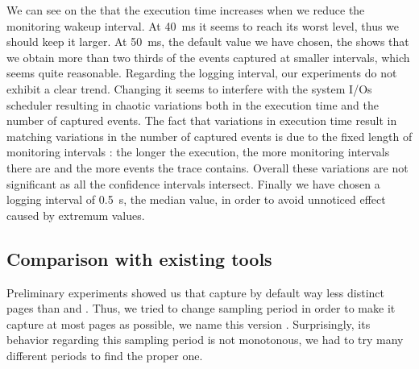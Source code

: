 We can see on the  that the execution time increases when we
reduce the monitoring wakeup interval. At \SI{40}{ms}
it seems to reach its worst level, thus we should keep it larger. At \SI{50}{ms}, the default value we have chosen, the
 shows that we obtain more than two thirds of the events captured
at smaller intervals, which seems quite reasonable.
Regarding the logging interval, our experiments do not exhibit a clear trend. Changing it seems to interfere with the system I/Os scheduler resulting in chaotic
variations both in the execution time and the number of captured events. The fact that variations in execution time result in matching variations in the number
of captured events is due to the fixed length of monitoring intervals : the longer the execution, the more monitoring intervals there are and the more events
the trace contains. Overall these variations are not significant as all the confidence intervals intersect. 
Finally we have chosen a logging interval of \SI{0.5}{s}, the median value, in order to avoid unnoticed effect caused by extremum values.



\subsection{Comparison with existing tools}
\label{sec:expe-ovh}

Preliminary experiments showed us that \Mitos capture by
default way less distinct pages than \TABARNAC and \Moca. Thus, we tried to change \Mitos
sampling period in order to make it capture at most pages as possible, 
we name this version \MitosTun. Surprisingly, its behavior regarding this sampling period
is not monotonous, we had to try many different periods to find the proper one.

